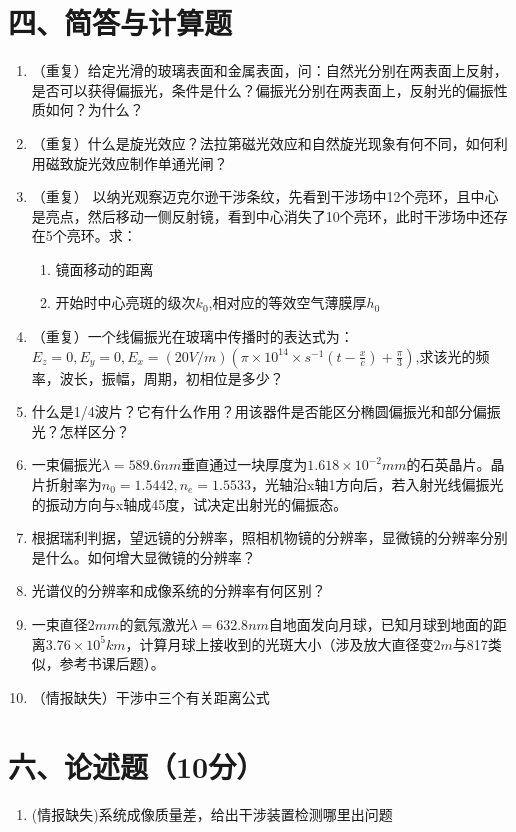 \documentclass[12pt, a4paper]{article}
\theoremstyle{solution}
\begin{document}
\section*{四、简答与计算题}
\begin{enumerate}
    \item （重复）给定光滑的玻璃表面和金属表面，问：自然光分别在两表面上反射，是否可以获得偏振光，条件是什么？偏振光分别在两表面上，反射光的偏振性质如何？为什么？
    \item （重复）什么是旋光效应？法拉第磁光效应和自然旋光现象有何不同，如何利用磁致旋光效应制作单通光闸？
    \item （重复） 以纳光观察迈克尔逊干涉条纹，先看到干涉场中12个亮环，且中心是亮点，然后移动一侧反射镜，看到中心消失了10个亮环，此时干涉场中还存在5个亮环。求：
    \begin{enumerate}
        \item 镜面移动的距离
        \item 开始时中心亮斑的级次$k_0$,相对应的等效空气薄膜厚$h_0$
    \end{enumerate}
    \item （重复）一个线偏振光在玻璃中传播时的表达式为：$E_z=0,E_y=0,E_x=(20V/m)(\pi\times10^{14}\times s^{-1}(t-\frac{x}{c})+\frac{\pi}{3})$,求该光的频率，波长，振幅，周期，初相位是多少？
    \item 什么是1/4波片？它有什么作用？用该器件是否能区分椭圆偏振光和部分偏振光？怎样区分？
    \item 一束偏振光$\lambda=589.6nm$垂直通过一块厚度为$1.618\times10^{-2}mm$的石英晶片。晶片折射率为$n_0=1.5442,n_e=1.5533$，光轴沿x轴1方向后，若入射光线偏振光的振动方向与x轴成45度，试决定出射光的偏振态。
    \item 根据瑞利判据，望远镜的分辨率，照相机物镜的分辨率，显微镜的分辨率分别是什么。如何增大显微镜的分辨率？
    \item 光谱仪的分辨率和成像系统的分辨率有何区别？
    \item 一束直径$2mm$的氦氖激光$\lambda=632.8nm$自地面发向月球，已知月球到地面的距离$3.76\times10^{5}km$，计算月球上接收到的光斑大小（涉及放大直径变$2m$与817类似，参考书课后题）。
    \item （情报缺失）干涉中三个有关距离公式
\end{enumerate}
\section*{六、论述题（10分）}
\begin{enumerate}
    \item (情报缺失)系统成像质量差，给出干涉装置检测哪里出问题
\end{enumerate}
\end{document}
